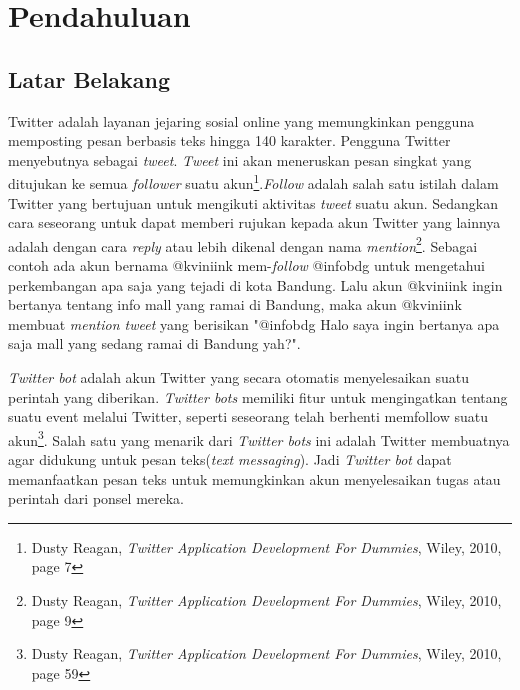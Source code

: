 \chapter{Pendahuluan}
\label{chap:pendahuluan}

\section{Latar Belakang}
\label{sec:latar belakang}

Twitter adalah layanan jejaring sosial online yang memungkinkan pengguna memposting pesan berbasis teks hingga 140 karakter. Pengguna Twitter menyebutnya sebagai \textit{tweet}. \textit{Tweet} ini akan meneruskan pesan singkat yang ditujukan ke semua \textit{follower} suatu akun\footnote{Dusty Reagan, \textit{Twitter Application Development For Dummies}, Wiley, 2010, page 7}.\textit{Follow} adalah salah satu istilah dalam Twitter yang bertujuan untuk mengikuti aktivitas \textit{tweet} suatu akun. Sedangkan cara seseorang untuk dapat memberi rujukan kepada akun Twitter yang lainnya adalah dengan cara \textit{reply} atau lebih dikenal dengan nama \textit{mention}\footnote{Dusty Reagan, \textit{Twitter Application Development For Dummies}, Wiley, 2010, page 9}. Sebagai contoh ada akun bernama @kviniink mem-\textit{follow} @infobdg untuk mengetahui perkembangan apa saja yang tejadi di kota Bandung. Lalu akun @kviniink ingin bertanya tentang info mall yang ramai di Bandung, maka akun @kviniink membuat \textit{mention tweet} yang berisikan "@infobdg Halo saya ingin bertanya apa saja mall yang sedang ramai di Bandung yah?".

\textit{Twitter bot} adalah akun Twitter yang secara otomatis menyelesaikan suatu perintah yang diberikan. \textit{Twitter bots} memiliki fitur untuk  mengingatkan tentang suatu event melalui Twitter, seperti seseorang telah berhenti memfollow suatu akun\footnote{Dusty Reagan, \textit{Twitter Application Development For Dummies}, Wiley, 2010, page 59}. Salah satu yang menarik dari \textit{Twitter bots} ini adalah Twitter membuatnya agar didukung untuk pesan teks(\textit{text messaging}). Jadi \textit{Twitter bot} dapat memanfaatkan pesan teks untuk memungkinkan akun menyelesaikan tugas atau perintah dari ponsel mereka.

